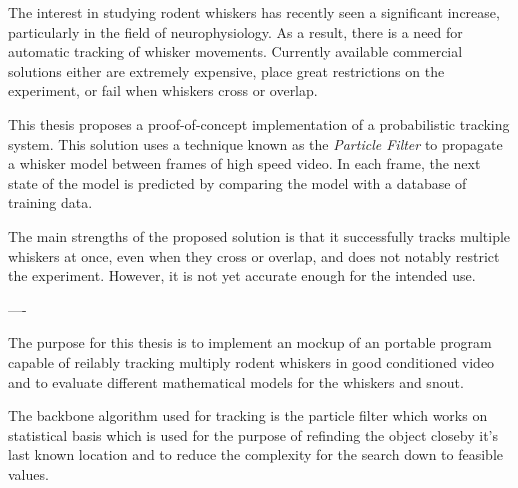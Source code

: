 The interest in studying rodent whiskers has recently seen a significant increase, particularly in the field of neurophysiology. As a result, there is a need for automatic tracking of whisker movements. Currently available commercial solutions either are extremely expensive, place great restrictions on the experiment, or fail when whiskers cross or overlap.

This thesis proposes a proof-of-concept implementation of a probabilistic tracking system. This solution uses a technique known as the \emph{Particle Filter} to propagate a whisker model between frames of high speed video. In each frame, the next state of the model is predicted by comparing the model with a database of training data.

The main strengths of the proposed solution is that it successfully tracks multiple whiskers at once, even when they cross or overlap, and does not notably restrict the experiment. However, it is not yet accurate enough for the intended use.

----

The purpose for this thesis is to implement an mockup of an portable 
program capable of reilably tracking multiply rodent whiskers 
in good conditioned video and to evaluate different mathematical 
models for the whiskers and snout. 

The backbone algorithm used 
for tracking is the particle filter which works on statistical basis which
is used for the purpose of refinding the object closeby it's last known location
and to reduce the complexity for the search down to feasible values.
